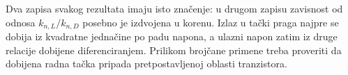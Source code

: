 Dva zapisa svakog rezultata imaju isto značenje: u drugom zapisu zavisnost od odnosa $k_{n,L}/k_{n,D}$ posebno je izdvojena u korenu. Izlaz u tački praga najpre se dobija iz kvadratne jednačine po padu napona, a ulazni napon zatim iz druge relacije dobijene diferenciranjem. Prilikom brojčane primene treba proveriti da dobijena radna tačka pripada pretpostavljenoj oblasti tranzistora.
